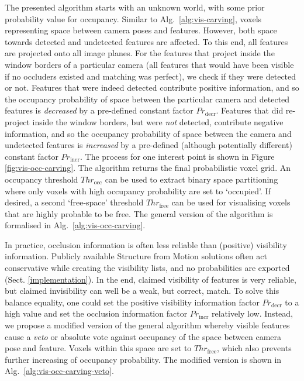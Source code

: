 The presented algorithm starts with an unknown world, with some prior probability value for occupancy. Similar to Alg.~\ref{alg:vis-carving}, voxels representing space between camera poses and features. However, both space towards detected and undetected features are affected. To this end, all features are projected onto all image planes. For the features that project inside the window borders of a particular camera (\ie all features that would have been visible if no occluders existed and matching was perfect), we check if they were detected or not. Features that were indeed detected contribute positive information, and so the occupancy probability of space between the particular camera and detected features is \emph{decreased} by a pre-defined constant factor $Pr_{\textrm{decr}}$. Features that did re-project inside the window borders, but were \emph{not} detected, contribute negative information, and so the occupancy probability of space between the camera and undetected features is \emph{increased} by a pre-defined (although potentially different) constant factor $Pr_{\textrm{incr}}$. The process for one interest point is shown in Figure \ref{fig:vis-occ-carving}. The algorithm returns the final probabilistic voxel grid. An occupancy threshold $Thr_{\textrm{occ}}$ can be used to extract binary space partitioning where only voxels with high occupancy probability are set to `occupied'. If desired, a second `free-space' threshold $Thr_{\textrm{free}}$ can be used for visualising voxels that are highly probable to be free. The general version of the algorithm is formalised in Alg.~\ref{alg:vis-occ-carving}.

In practice, occlusion information is often less reliable than (positive) visibility information. Publicly available Structure from Motion solutions often act conservative while creating the visibility lists, and no probabilities are exported (Sect. \ref{implementation}). In the end, claimed visibility of features is very reliable, but claimed invisibility can well be a weak, but correct, match. To solve this balance equality, one could set the positive visibility information factor $Pr_{\textrm{decr}}$ to a high value and set the occlusion information factor $Pr_{\textrm{incr}}$ relatively low. Instead, we propose a modified version of the general algorithm whereby visible features cause a \emph{veto} or absolute vote against occupancy of the space between camera pose and feature. Voxels within this space are set to $Thr_{\textrm{free}}$, which also prevents further increasing of occupancy probability. The modified version is shown in Alg.~\ref{alg:vis-occ-carving-veto}.

